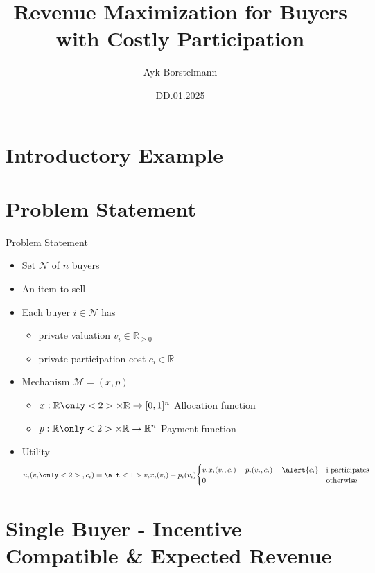\documentclass{beamer}
\title{Revenue Maximization for Buyers with Costly Participation}
\date{DD.01.2025}
\author{Ayk Borstelmann}
\institute{
    Seminar Algorithmic Game Theory
}
\begin{document}
\maketitle
\section{Introductory Example}
\section{Problem Statement}
\begin{frame}{Problem Statement}
  \begin{itemize}
    \item Set $\mathcal{N}$ of $n$ buyers
    \item An item to sell
    \item Each buyer $i \in \mathcal{N}$ has
          \begin{itemize}
            \item private valuation $v_i \in \mathbb{R}_{\geq0}$
            \item<2-> \alert{private participation cost $c_i \in \mathbb{R}$}
          \end{itemize}
    \item Mechanism $\mathcal{M} = (x,p)$
          \begin{itemize}
            \item $x: \mathbb{R} \only<2>{\times \mathbb{R}} \rightarrow [0,1]^n$ Allocation function
            \item $p: \mathbb{R} \only<2>{\times \mathbb{R}} \rightarrow \mathbb{R}^n$ Payment function
          \end{itemize}
    \item Utility
          \begin{align*}
            u_i(v_i\only<2>{, c_i}) = \alt<1>{v_i x_i(v_i) - p_i(v_i)}{\begin{cases}v_i x_i(v_i, c_i) - p_i(v_i, c_i) - \alert{c_i} & \text{i participates} \\ 0 & \text{otherwise}\end{cases}}
          \end{align*}
  \end{itemize}
\end{frame}
\section{Single Buyer - Incentive Compatible \& Expected Revenue}
\end{document}
